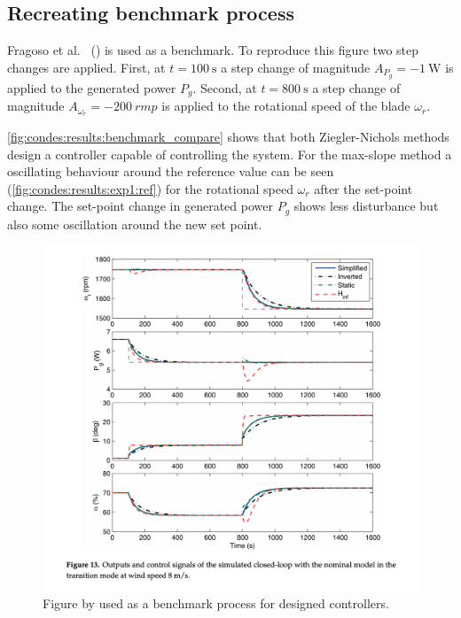 \subsection{Recreating benchmark process}

Fragoso et al.~ (\cite[p. 14, Figure 13]{Fragoso_et_al_2017}) is used as a benchmark.
To reproduce this figure two step changes are applied.
First, at $t=\SI{100}{\second}$ a step change of magnitude $A_{P_g}=\SI{-1}{\watt}$ is applied to the generated power $P_g$.
Second, at $t=\SI{800}{\second}$ a step change of magnitude $A_{\omega_r}=\SI{-200}{rmp}$ is applied to the rotational speed of the blade $\omega_r$.

\autoref{fig:condes:results:benchmark_compare} shows that both Ziegler-Nichols methods design a controller capable of controlling the system.
For the max-slope method a oscillating behaviour around the reference value can be seen (\autoref{fig:condes:results:exp1:ref}) for the rotational speed $\omega_r$ after the set-point change.
The set-point change in generated power $P_g$ shows less disturbance but also some oscillation around the new set point.

\begin{figure}[H]
    \center
    \includegraphics[width=1\textwidth,scale=1,trim=0 0 0 0,clip]{fig/Fragoso_et_al_2017_fig13.png}
    \caption{Figure by \cite{Fragoso_et_al_2017} used as a benchmark process for designed controllers.}
    \label{fig:condes:results:benchmark}
\end{figure}



